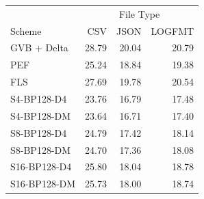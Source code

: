 \begin{tabular}{lrrr}
\toprule
 & \multicolumn{3}{c}{File Type} \\
Scheme & CSV & JSON & LOGFMT \\
\midrule
GVB + Delta & 28.79 & 20.04 & 20.79 \\
PEF & 25.24 & 18.84 & 19.38 \\
FLS & 27.69 & 19.78 & 20.54 \\
S4-BP128-D4 & 23.76 & 16.79 & 17.48 \\
S4-BP128-DM & 23.64 & 16.71 & 17.40 \\
S8-BP128-D4 & 24.79 & 17.42 & 18.14 \\
S8-BP128-DM & 24.70 & 17.36 & 18.08 \\
S16-BP128-D4 & 25.80 & 18.04 & 18.78 \\
S16-BP128-DM & 25.73 & 18.00 & 18.74 \\
\bottomrule
\end{tabular}
